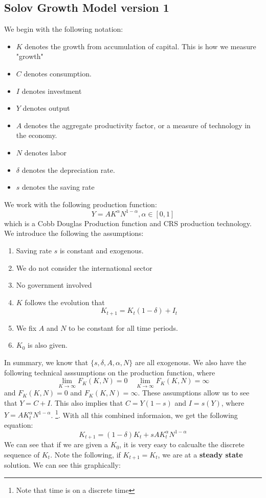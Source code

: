 \documentclass[11pt]{article}
\begin{document}
\subsection{Solov Growth Model version 1}
We begin with the following notation:
\begin{itemize}
    \item $K$ denotes the growth from accumulation of capital. This is how we measure "growth"
    \item $C$ denotes consumption. 
    \item $I$ denotes investment
    \item $Y$ denotes output
    \item $A$ denotes the aggregate productivity factor, or a measure of technology in the economy. 
    \item $N$ denotes labor 
    \item $\delta$ denotes the depreciation rate. 
    \item $s$ denotes the saving rate
\end{itemize}
We work with the following production function:
\[
Y = AK^\alpha N^{1-\alpha}, \alpha \in [0,1]
\]
which is a Cobb Douglas Production function and CRS production technology. We introduce the following the assumptions:
\begin{enumerate}
    \item Saving rate $s$ is constant and exogenous. 
    \item We do not consider the international sector 
    \item No government involved 
    \item $K$ follows the evolution that \[K_{t+1}= K_t(1-\delta) + I_t\]
    \item We fix $A$ and $N$ to be constant for all time periods. 
    \item $K_0$ is also given. 
\end{enumerate}
In summary, we know that $\{s, \delta, A, \alpha, N\}$ are all exogenous. We also have the following technical asssumptions on the production function, where 
\[
\lim_{K \to \infty} F_K(K,N) = 0 \quad \lim_{K \to \infty} F_K(K,N) = \infty
\]
and $F_K (K, N) = 0$ and $F_K(K,N) = \infty$. 
These assumptions allow us to see that $Y = C + I$. This also implies that $C = Y(1-s)$ and $I = s(Y)$, where $Y = A K^\alpha_t N^{1-\alpha}$. \footnote{Note that time is on a discrete time}. With all this combined informaion, we get the following equation:
\[
K_{t+1} = (1-\delta) K_t + sA K^\alpha_t N^{1-\alpha}
\]
We can see that if we are given a $K_0$, it is very easy to calcualte the discrete sequence of $K_t$.
Note the following, if $K_{t+1} = K_t$, we are at a \textbf{steady state} solution. We can see this graphically: 
\end{document}

